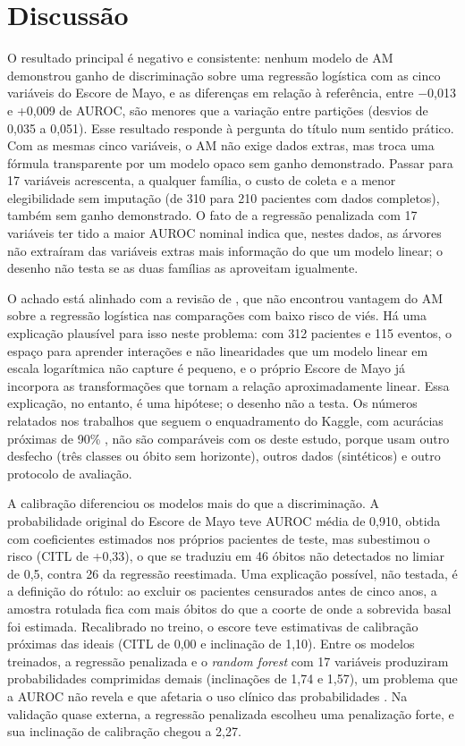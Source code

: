 \section{Discussão}\label{sec:discussao}

O resultado principal é negativo e consistente: nenhum modelo de AM demonstrou ganho de discriminação sobre uma regressão logística com as cinco variáveis do Escore de Mayo, e as diferenças em relação à referência, entre $-$0,013 e +0,009 de AUROC, são menores que a variação entre partições (desvios de 0,035 a 0,051). Esse resultado responde à pergunta do título num sentido prático. Com as mesmas cinco variáveis, o AM não exige dados extras, mas troca uma fórmula transparente por um modelo opaco sem ganho demonstrado. Passar para 17 variáveis acrescenta, a qualquer família, o custo de coleta e a menor elegibilidade sem imputação (de 310 para 210 pacientes com dados completos), também sem ganho demonstrado. O fato de a regressão penalizada com 17 variáveis ter tido a maior AUROC nominal indica que, nestes dados, as árvores não extraíram das variáveis extras mais informação do que um modelo linear; o desenho não testa se as duas famílias as aproveitam igualmente.

O achado está alinhado com a revisão de , que não encontrou vantagem do AM sobre a regressão logística nas comparações com baixo risco de viés. Há uma explicação plausível para isso neste problema: com 312 pacientes e 115 eventos, o espaço para aprender interações e não linearidades que um modelo linear em escala logarítmica não capture é pequeno, e o próprio Escore de Mayo já incorpora as transformações que tornam a relação aproximadamente linear. Essa explicação, no entanto, é uma hipótese; o desenho não a testa. Os números relatados nos trabalhos que seguem o enquadramento do Kaggle, com acurácias próximas de 90\% \cite{shakir2025cirrhosis,tu2025cirrhosis}, não são comparáveis com os deste estudo, porque usam outro desfecho (três classes ou óbito sem horizonte), outros dados (sintéticos) e outro protocolo de avaliação.

A calibração diferenciou os modelos mais do que a discriminação. A probabilidade original do Escore de Mayo teve AUROC média de 0,910, obtida com coeficientes estimados nos próprios pacientes de teste, mas subestimou o risco (CITL de +0,33), o que se traduziu em 46 óbitos não detectados no limiar de 0,5, contra 26 da regressão reestimada. Uma explicação possível, não testada, é a definição do rótulo: ao excluir os pacientes censurados antes de cinco anos, a amostra rotulada fica com mais óbitos do que a coorte de onde a sobrevida basal foi estimada. Recalibrado no treino, o escore teve estimativas de calibração próximas das ideais (CITL de 0,00 e inclinação de 1,10). Entre os modelos treinados, a regressão penalizada e o \textit{random forest} com 17 variáveis produziram probabilidades comprimidas demais (inclinações de 1,74 e 1,57), um problema que a AUROC não revela e que afetaria o uso clínico das probabilidades \cite{vancalster2019calibration}. Na validação quase externa, a regressão penalizada escolheu uma penalização forte, e sua inclinação de calibração chegou a 2,27.

